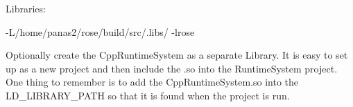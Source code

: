 Libraries:

 -L/home/panas2/rose/build/src/.libs/ -lrose

Optionally create the CppRuntimeSystem as a separate Library. It is easy to set up as a new project and then include the .so into the RuntimeSystem project. One thing to remember is to add the CppRuntimeSystem.so into the LD_LIBRARY_PATH so that it is found when the project is run.


